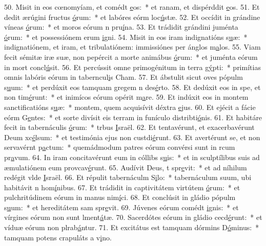 50. Misit in eos cœnomyíam, et comédt \uline{e}os:~* et ranam, et dispérddit \uline{e}os.
51. Et dedit ærúgini fructus \uline{ó}rum:~* et labóres eórm loc\uline{ú}stæ.
52. Et occídit in grándine víneas \uline{ó}rum:~* et moros eórum n pru\uline{í}na.
53. Et trádidit grándini juménta \uline{ó}rum:~* et possessiónem erum \uline{i}gni.
54. Misit in eos iram indignatións s\uline{u}æ:~* indignatiónem, et iram, et tribulatiónem: immissiónes per ánglos m\uline{a}los.
55. Viam fecit sémitæ iræ suæ, non pepércit a morte animábus \uline{ó}rum:~* et juménta eórum in mort concl\uline{ú}sit.
56. Et percússit omne primogénitum in terra g\uline{ý}pti:~* primítias omnis labóris eórum in taberncul\uline{i}s Cham.
57. Et ábstulit sicut oves pópulm s\uline{u}um:~* et perdúxit eos tamquam gregem n des\uline{é}rto.
58. Et dedúxit eos in spe, et non tim\uline{é}runt:~* et inimícos eórum opérit m\uline{a}re.
59. Et indúxit eos in montem sanctificatións s\uline{u}æ:~* montem, quem acquisívit déxtra \uline{e}jus.
60. Et ejécit a fácie eórm G\uline{e}ntes:~* et sorte divísit eis terram in funículo distribti\uline{ó}nis.
61. Et habitáre fecit in tabernáculis \uline{ó}rum:~* trbus \uline{I}sraël.
62. Et tentavérunt, et exacerbavérunt Deum xc\uline{é}lsum:~* et testimónia ejus non custdi\uline{é}runt.
63. Et avertérunt se, et non servavérnt p\uline{a}ctum:~* quemádmodum patres eórum convérsi sunt in rcum pr\uline{a}vum.
64. In iram concitavérunt eum in cóllibs s\uline{u}is:~* et in sculptílibus suis ad æmulatiónem eum provcav\uline{é}runt.
65. Audívit Deus, t spr\uline{e}vit:~* et ad níhilum redégit vlde \uline{I}sraël.
66. Et répulit tabernáculm S\uline{i}lo:~* tabernáculum suum, ubi habitávit n hom\uline{í}nibus.
67. Et trádidit in captivitátem virtútem \uline{ó}rum:~* et pulchritúdinem eórum in manus nim\uline{í}ci.
68. Et conclúsit in gládio pópulm s\uline{u}um:~* et hereditátem sam spr\uline{e}vit.
69. Júvenes eórum comédt \uline{i}gnis:~* et vírgines eórum non sunt lment\uline{á}tæ.
70. Sacerdótes eórum in gládio cecd\uline{é}runt:~* et víduæ eórum non plrab\uline{á}ntur.
71. Et excitátus est tamquam dórmins D\uline{ó}minus:~* tamquam potens crapuláts a v\uline{i}no.
